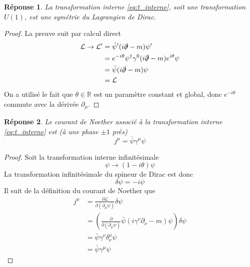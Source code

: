 \documentclass{article}
\numberwithin{equation}{section}
\theoremstyle{solution}
\newtheorem{solution}{Réponse}[section]
\begin{document}
\begin{solution}
La transformation interne \eqref{eq:t_interne}, soit une transformation $U(1)$, est une symétrie du Lagrangien de Dirac.	
\end{solution}
\begin{proof}
La preuve suit par calcul direct
\begin{align*}
        \mathcal{L} \rightarrow \mathcal{L}'  &= \bar{\psi}'  (i \slashed{\partial} - m) \psi' \\
                &= e^{-i\theta} \psi^{\dagger} \gamma^0(i \slashed{\partial} - m) e^{i\theta} \psi \\
                &= \bar{\psi} (i \slashed{\partial} - m)  \psi \\
                &= \mathcal{L}
\end{align*}	
On a utilisé le fait que $\theta \in \mathbb{R}$ est un paramètre constant et global, donc $e^{-i\theta}$ commute avec 
la dérivée $\partial_\mu$.
\end{proof}

\begin{solution}
Le courant de Noether associé à la transformation interne \eqref{eq:t_interne} est (à une phase $\pm 1$ près)
\begin{equation}
        \boxed{j^{\mu} = \bar{\psi} \gamma^{\mu} \psi}
\end{equation} 
\end{solution}
\begin{proof}
Soit la transformation interne infinitésimale
\begin{equation}
        \psi \rightarrow  (1 - i \theta) \psi
\end{equation} 
La transformation infinitésimale du spineur de Dirac est donc 
\begin{equation}
        \delta \psi = -i \psi
\end{equation} 
Il suit de la définition du courant de Noether que
\begin{align*}
        j^{\mu} &= \frac{\partial \mathcal{L}}{\partial (\partial_{\mu} \psi)} \delta \psi \\
        &= \left(  \frac{\partial }{\partial (\partial_{\mu}\psi)} \bar{\psi}(i \gamma^{\nu} \partial_\nu - m) \psi\right) \delta\psi\\
        &= \bar{\psi}\gamma^{\nu} \delta^{\mu}_\nu \psi \\
        &= \bar{\psi}\gamma^{\mu}\psi
\end{align*} 
\end{proof}
\end{document}
